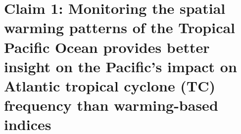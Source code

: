 \section{Claim 1: Monitoring the spatial warming patterns of the Tropical Pacific Ocean provides better insight on the Pacific's impact on Atlantic tropical cyclone (TC) frequency than warming-based indices}